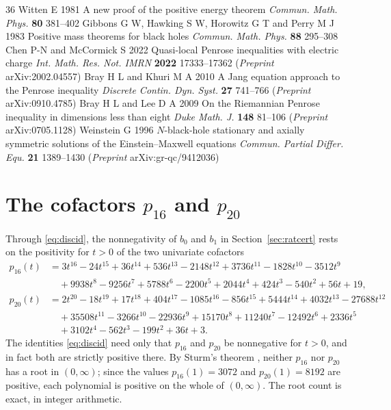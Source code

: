 \documentclass[11pt]{article}
\theoremstyle{plain}
\theoremstyle{definition}
\begin{document}
\begin{thebibliography}{36}
 Witten E 1981 A new proof of the positive energy theorem \emph{Commun. Math. Phys.}
  \textbf{80} 381--402
 Gibbons G W, Hawking S W, Horowitz G T and Perry M J 1983 Positive mass theorems for black
  holes \emph{Commun. Math. Phys.} \textbf{88} 295--308
 Chen P-N and McCormick S 2022 Quasi-local Penrose inequalities with electric charge
  \emph{Int. Math. Res. Not. IMRN} \textbf{2022} 17333--17362 (\emph{Preprint} arXiv:2002.04557)
 Bray H L and Khuri M A 2010 A Jang equation approach to the Penrose inequality
  \emph{Discrete Contin. Dyn. Syst.} \textbf{27} 741--766 (\emph{Preprint} arXiv:0910.4785)
 Bray H L and Lee D A 2009 On the Riemannian Penrose inequality in dimensions less than eight
  \emph{Duke Math. J.} \textbf{148} 81--106 (\emph{Preprint} arXiv:0705.1128)
 Weinstein G 1996 $N$-black-hole stationary and axially symmetric solutions of the
  Einstein--Maxwell equations \emph{Commun. Partial Differ. Equ.} \textbf{21} 1389--1430
  (\emph{Preprint} arXiv:gr-qc/9412036)
\end{thebibliography}

\appendix
\section{The cofactors \texorpdfstring{$p_{16}$}{p16} and \texorpdfstring{$p_{20}$}{p20}}\label{app:sos}

Through \eqref{eq:discid}, the nonnegativity of $b_0$ and $b_1$ in Section~\ref{sec:ratcert} rests on the
positivity for $t>0$ of the two univariate cofactors
\begin{align*}
   p_{16}(t)&=3t^{16}-24t^{15}+36t^{14}+536t^{13}-2148t^{12}+3736t^{11}-1828t^{10}-3512t^{9}\\
   &\quad+9938t^{8}-9256t^{7}+5788t^{6}-2200t^{5}+2044t^{4}+424t^{3}-540t^{2}+56t+19,\\
   p_{20}(t)&=2t^{20}-18t^{19}+17t^{18}+404t^{17}-1085t^{16}-856t^{15}+5444t^{14}+4032t^{13}-27688t^{12}\\
   &\quad+35508t^{11}-3266t^{10}-22936t^{9}+15170t^{8}+11240t^{7}-12492t^{6}+2336t^{5}\\
   &\quad+3102t^{4}-562t^{3}-199t^{2}+36t+3.
\end{align*}
The identities \eqref{eq:discid} need only that $p_{16}$ and $p_{20}$ be nonnegative for $t>0$, and in fact both
are strictly positive there. By Sturm's theorem \cite{BasuPollackRoy}, neither $p_{16}$ nor $p_{20}$ has a root
in $(0,\infty)$; since the values $p_{16}(1)=3072$ and $p_{20}(1)=8192$ are positive, each polynomial is positive
on the whole of $(0,\infty)$. The root count is exact, in integer arithmetic.
\end{document}
